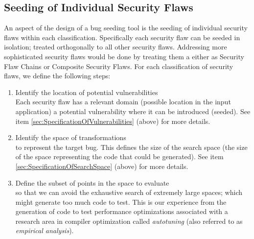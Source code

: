 \subsection{Seeding of Individual Security Flaws}
         \label{sec:SeedingOfSecurityFlaws}
         An aspect of the design of a bug seeding tool is the seeding of individual
         security flaws within each classification. Specifically each security flaw can be
         seeded in isolation; treated orthogonally to all other security flaws. Addressing
         more sophisticated security flaws would be done by treating them a either as
         Security Flaw Chains or Composite Security Flaws.
         For each classification of security flaws, we define the following steps:
            \begin{enumerate}
               \item Identify the location of potential vulnerabilities \\ Each security
                     flaw has a relevant domain (possible location in the input
                     application) a potential vulnerability where it 
                     can be introduced (seeded).  See item 
                     \ref{sec:SpecificationOfVulnerabilities} (above) for more details.

               \item Identify the space of transformations \\ to represent the target bug.
                     This defines the size of the search space (the size of the 
                     space representing the code that could be generated). See item 
                     \ref{sec:SpecificationOfSearchSpace} (above) for more details.

               \item Define the subset of points in the space to evaluate \\ so that we can
                     avoid the exhaustive search of extremely large spaces; which might
                     generate too much code to test. This is our experience from 
                     the generation of code to test performance optimizations associated
                     with a research area in compiler optimization called {\em autotuning}
                     (also referred to as {\em empirical analysis}).


\end{enumerate}
